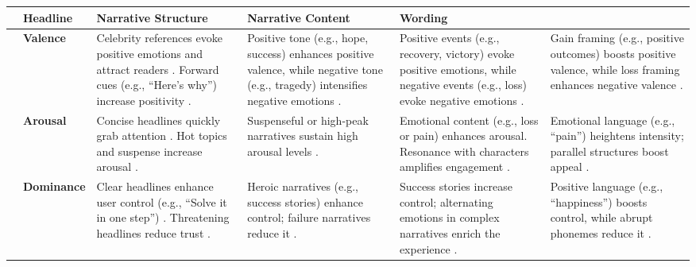 \renewcommand{\arraystretch}{1.8} %
\begin{table*}[ht]
\fontsize{8}{9}\selectfont
\centering

\begin{tabularx}{\textwidth}{|>{\centering\arraybackslash}m{0.5cm}|>{\centering\arraybackslash}m{1.4cm}|>{\centering\arraybackslash}m{3.4cm}|>{\centering\arraybackslash}m{3.4cm}|>{\centering\arraybackslash}m{3.4cm}|>{\centering\arraybackslash}m{3.4cm}|}
\hline
\rowcolor[HTML]{D9EAD3} 
\multicolumn{2}{|c|}{\textbf{Dimension}} & \textbf{Headline} & \textbf{Narrative Structure} & \textbf{Narrative Content} & \textbf{Wording} \\ 
\hline

\multirow{3}{*}{\rotatebox{90}{\parbox{3cm}{\centering \textbf{Emotional \\ Dimensions}}}} & 
\cellcolor[HTML]{FDF6E8} \textbf{Valence} &    
Celebrity references evoke positive emotions and attract readers \cite{kim2016compete}.
Forward cues (e.g., “Here’s why”) increase positivity \cite{blom2015click}. & 
Positive tone (e.g., hope, success) enhances positive valence, while negative tone (e.g., tragedy) intensifies negative emotions \cite{mar2011emotion}. & 
Positive events (e.g., recovery, victory) evoke positive emotions, while negative events (e.g., loss) evoke negative emotions \cite{lekkas2022using}. & 
Gain framing (e.g., positive outcomes) boosts positive valence, while loss framing enhances negative valence \cite{seo2019process}. \\ \cline{2-6}

& \cellcolor[HTML]{FDF6E8} \textbf{Arousal} & 
Concise headlines quickly grab attention \cite{blom2015click}. 
Hot topics and suspense increase arousal \cite{kim2016compete}. & 
Suspenseful or high-peak narratives sustain high arousal levels \cite{leshner2018breast}. & 
Emotional content (e.g., loss or pain) enhances arousal. Resonance with characters amplifies engagement \cite{lekkas2022using}. & 
Emotional language (e.g., “pain”) heightens intensity; parallel structures boost appeal \cite{menninghaus2017emotional}. \\ \cline{2-6}

& \cellcolor[HTML]{FDF6E8} \textbf{Dominance} & 
Clear headlines enhance user control (e.g., “Solve it in one step”) \cite{kourogi2015identifying}. Threatening headlines reduce trust \cite{kim2016compete}. & 
Heroic narratives (e.g., success stories) enhance control; failure narratives reduce it \cite{jaaskelainen2020neural}. & 
Success stories increase control; alternating emotions in complex narratives enrich the experience \cite{lekkas2022using}. & 
Positive language (e.g., “happiness”) boosts control, while abrupt phonemes reduce it \cite{menninghaus2017emotional}. \\ \hline


\end{tabularx}
\end{table*}
